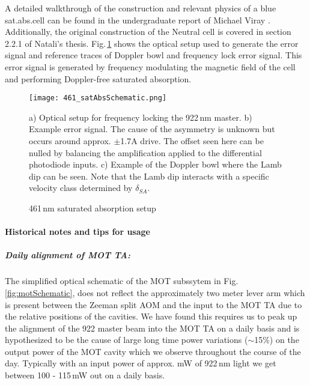 A detailed walkthrough of the construction and relevant physics of a blue sat.\;abs.\;cell can be found in the undergraduate report of Michael Viray \cite{MichaelViray2014}.
Additionally, the original construction of the Neutral cell is covered in section 2.2.1 of Natali's thesis.
Fig.\,\ref{fig:blueSatAbs} shows the optical setup used to generate the error signal and reference traces of Doppler bowl and frequency lock error signal.
This error signal is generated by frequency modulating the magnetic field of the cell and performing Doppler-free saturated absorption.
	\begin{figure} 
		\centerline{
		\texttt{[image: 461\_satAbsSchematic.png]}}
		\caption{461\,nm saturated absorption setup}{a) Optical setup for frequency locking the 922\,nm master. b) Example error signal. The cause of the asymmetry is unknown but occurs around approx. $\pm$1.7A drive. The offset seen here can be nulled by balancing the amplification applied to the differential photodiode inputs. c) Example of the Doppler bowl where the Lamb dip can be seen. Note that the Lamb dip interacts with a specific velocity class determined by $\delta_{SA}$.}
		\label{fig:blueSatAbs}
	\end{figure}

\paragraph{Historical notes and tips for usage}
\subparagraph{Daily alignment of MOT TA:}
The simplified optical schematic of the MOT subssytem in Fig.\,\ref{fig:motSchematic}, does not reflect the approximately two meter lever arm which is present between the Zeeman split AOM and the input to the MOT TA due to the relative positions of the cavities.
We have found this requires us to peak up the alignment of the 922 master beam into the MOT TA on a daily basis and is hypothesized to be the cause of large long time power variations ($\sim$15\%) on the output power of the MOT cavity which we observe throughout the course of the day.
Typically with an input power of approx. mW of 922\,nm light we get between 100 - 115\,mW out on a daily basis.

